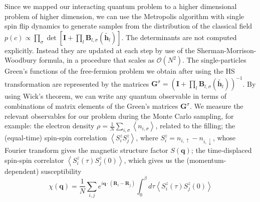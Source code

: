 Since we mapped our interacting quantum problem to a higher dimensional  problem of higher dimension, we can use the Metropolis algorithm with single spin flip dynamics to generate samples from the distribution of the classical field $p (c) \propto \prod_\sigma \det [\bm I + \prod_l \bm B_{l, \sigma} ( \widetilde{\bm h_l} ) ]$.
The determinants are not computed explicitly.
Instead they are updated at each step by use of the Sherman-Morrison-Woodbury formula, in a procedure that scales as $\mathcal{O}(N^2)$.
The single-particles Green's functions of the free-fermion problem we obtain after using the HS transformation are represented by the matrices $\bm G^\sigma = (\bm I + \prod_l \bm B_{l, \sigma} ( \widetilde{\bm h_l}))^{-1}$.
By using Wick's theorem, we can write any quantum observable in terms of combinations of matrix elements of the Green's matrices $\bm G^\sigma$.
We measure the relevant observables for our problem during the Monte Carlo sampling, for example: the electron density $\rho = \frac{1}{N} \sum_{i, \sigma} \left\langle n_{i, \sigma} \right\rangle$, related to the filling; the (equal-time) spin-spin correlation $\left\langle S_i^z S_j^z \right\rangle$, where $S_i^z = n_{i, \uparrow} - n_{i, \downarrow}$, whose Fourier transform gives the magnetic structure factor $S(\bm q)$; the time-displaced spin-spin correlator $\left\langle S_i^z (\tau) S_j^z (0) \right\rangle$, which gives us the (momentum-dependent) susceptibility 
\begin{equation}\label{eq:chi}
\chi ( \bm q ) = \frac{1}{N} \sum_{i, j} e^{i \bm q \cdot ( \bm R_i - \bm R_j )} \int_0^\beta d\tau \left\langle S_i^z (\tau) S_j^z (0) \right\rangle
\end{equation}
